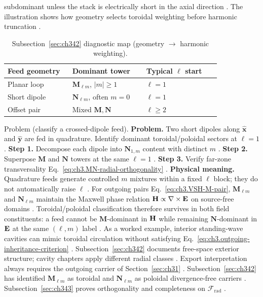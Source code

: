 subdominant unless the stack is electrically short in the axial direction \cite{jackson1999}. The illustration
shows how geometry selects toroidal weighting before harmonic truncation \cite{harrington2001}.
\begin{table}[t]
\centering
\caption{Subsection~\ref{sec:ch342} diagnostic map (geometry \(\to\) harmonic weighting).}
\label{tab:ch3.342-diagnostic-map}
\small
\begin{tabular}{@{}p{0.28\linewidth}p{0.32\linewidth}p{0.32\linewidth}@{}}
\toprule
Feed geometry & Dominant tower & Typical \(\ell\) start \\
\midrule
Planar loop & \(\mathbf{M}_{\ell m}\), \(|m|\ge1\) & \(\ell=1\) \\
Short dipole & \(\mathbf{N}_{\ell m}\), often \(m=0\) & \(\ell=1\) \\
Offset pair & Mixed \(\mathbf{M},\mathbf{N}\) & \(\ell\ge2\) \\
\bottomrule
\end{tabular}
\end{table}
Problem (classify a crossed-dipole feed). \textbf{Problem.} Two short dipoles along \(\hat{\mathbf{x}}\) and \(\hat{\mathbf{y}}\) are fed in quadrature.
Identify dominant toroidal/poloidal sectors at \(\ell=1\) \cite{harrington2001}.
\textbf{Step 1.} Decompose each dipole into \(\mathbf{N}_{1,m}\) content with distinct \(m\) \cite{jackson1999}.
\textbf{Step 2.} Superpose \(\mathbf{M}\) and \(\mathbf{N}\) towers at the same \(\ell=1\) \cite{stratton1941}.
\textbf{Step 3.} Verify far-zone transversality Eq.~\eqref{eq:ch3.MN-radial-orthogonality} \cite{tai1994}.
\textbf{Physical meaning.} Quadrature feeds generate controlled \(m\) mixtures within a fixed \(\ell\) block; they do not
automatically raise \(\ell\) \cite{harrington2001}.
For outgoing pairs Eq.~\eqref{eq:ch3.VSH-M-pair}, \(\mathbf{M}_{\ell m}\) and \(\mathbf{N}_{\ell m}\) maintain the
Maxwell phase relation \(\mathbf{H}\propto \nabla\times\mathbf{E}\) on source-free domains \cite{stratton1941}. Toroidal/poloidal
classification therefore survives in both field constituents: a feed cannot be \(\mathbf{M}\)-dominant in \(\mathbf{H}\) while
remaining \(\mathbf{N}\)-dominant in \(\mathbf{E}\) at the same \((\ell,m)\) label \cite{harrington2001}.
As a worked example, interior standing-wave cavities can mimic toroidal circulation without satisfying
Eq.~\eqref{eq:ch3.outgoing-inheritance-criterion} \cite{stratton1941}. Subsection~\ref{sec:ch342} documents
free-space exterior structure; cavity chapters apply different radial classes \cite{jackson1999}. Export
interpretation always requires the outgoing carrier of Section~\ref{sec:ch31} \cite{kato1995}.
Subsection~\ref{sec:ch342} has identified \(\mathbf{M}_{\ell m}\) as toroidal and \(\mathbf{N}_{\ell m}\) as poloidal
divergence-free carriers \cite{hansen1988}. Subsection~\ref{sec:ch343} proves orthogonality and
completeness on \(\mathcal{F}_{\mathrm{rad}}\) \cite{stratton1941}.
